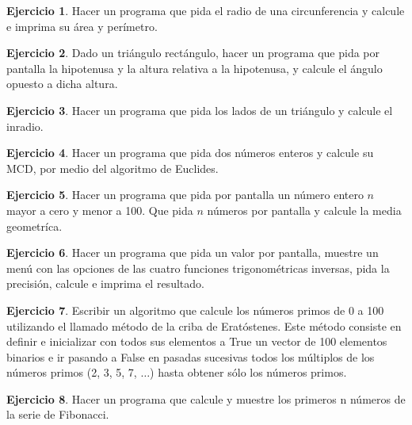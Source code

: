 \documentclass[12pt]{article}
\theoremstyle{definition}
\newtheorem{exercise}{Ejercicio}[section]
\begin{document}
    \begin{exercise}
        Hacer un programa que pida el radio de una circunferencia y calcule e imprima su área y perímetro.
    \end{exercise}

    \begin{exercise}
        Dado un triángulo rectángulo, hacer un programa que pida por pantalla la hipotenusa y la altura relativa a la
        hipotenusa, y calcule el ángulo opuesto a dicha altura.
    \end{exercise}

    \begin{exercise}
        Hacer un programa que pida los lados de un triángulo y calcule el inradio.
    \end{exercise}

    \begin{exercise}
        Hacer un programa que pida dos números enteros y calcule su MCD, por medio del algoritmo de Euclides.
    \end{exercise}

    \begin{exercise}
        Hacer un programa que pida por pantalla un número entero $n$ mayor a cero y menor a 100.
        Que pida $n$ números por pantalla y calcule la media geometríca.
    \end{exercise}

    \begin{exercise}
        Hacer un programa que pida un valor por pantalla, muestre un menú con las opciones de las cuatro funciones
        trigonométricas inversas, pida la precisión, calcule e imprima el resultado.
    \end{exercise}
    
    \begin{exercise}
        Escribir un algoritmo que calcule los números primos de 0 a 100 utilizando el llamado método de la criba de Eratóstenes.
        Este método consiste en definir e inicializar con todos sus elementos a True un vector de 100 elementos binarios e ir
        pasando a False en pasadas sucesivas todos los múltiplos de los números primos (2, 3, 5, 7, $\ldots$) hasta obtener sólo los números primos.
    \end{exercise}

    \begin{exercise}
        Hacer un programa que calcule y muestre los primeros n números de la serie de Fibonacci.
    \end{exercise}
\end{document}

